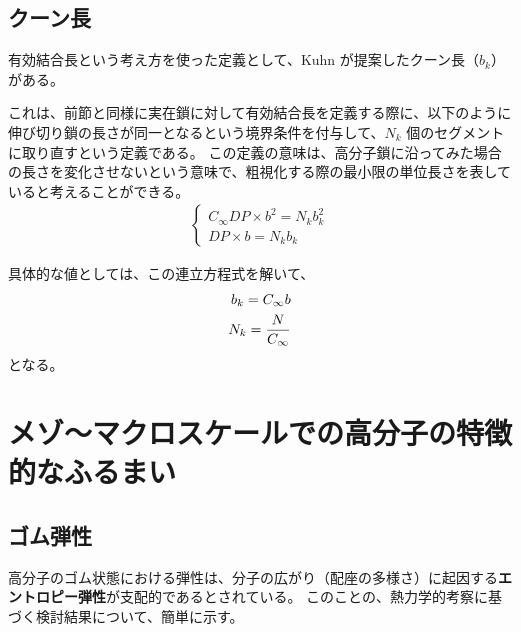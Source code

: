\documentclass[a4paper,11pt]{ltjsarticle}
\begin{document}
\subsection{クーン長}

有効結合長という考え方を使った定義として、Kuhn が提案したクーン長（$b_k$）がある。

これは、前節と同様に実在鎖に対して有効結合長を定義する際に、以下のように伸び切り鎖の長さが同一となるという境界条件を付与して、$N_k$ 個のセグメントに取り直すという定義である。
この定義の意味は、高分子鎖に沿ってみた場合の長さを変化させないという意味で、粗視化する際の最小限の単位長さを表していると考えることができる。
\begin{align}
 \begin{cases}
	C_{\infty} DP \times b^2 = N_k b_k^2 \\
	DP \times b = N_k b_k
 \end{cases}
\end{align}

具体的な値としては、この連立方程式を解いて、
\begin{align}
b_k = C_{\infty} b \notag \\
N_k = \dfrac{N}{C_{\infty} }
\end{align}
となる。

\newpage


\section{メゾ～マクロスケールでの高分子の特徴的なふるまい}

%
%
%
%

\subsection{ゴム弾性}

高分子のゴム状態における弾性は、分子の広がり（配座の多様さ）に起因する{\bf エントロピー弾性}が支配的であるとされている。
このことの、熱力学的考察に基づく検討結果について、簡単に示す。
\end{document}
